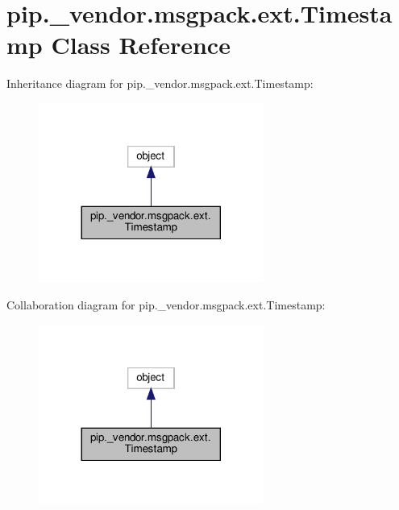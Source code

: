 \hypertarget{classpip_1_1__vendor_1_1msgpack_1_1ext_1_1Timestamp}{}\section{pip.\+\_\+vendor.\+msgpack.\+ext.\+Timestamp Class Reference}
\label{classpip_1_1__vendor_1_1msgpack_1_1ext_1_1Timestamp}


Inheritance diagram for pip.\+\_\+vendor.\+msgpack.\+ext.\+Timestamp\+:
\nopagebreak
\begin{figure}[H]
\begin{center}
\leavevmode
\includegraphics[width=209pt]{classpip_1_1__vendor_1_1msgpack_1_1ext_1_1Timestamp__inherit__graph}
\end{center}
\end{figure}


Collaboration diagram for pip.\+\_\+vendor.\+msgpack.\+ext.\+Timestamp\+:
\nopagebreak
\begin{figure}[H]
\begin{center}
\leavevmode
\includegraphics[width=209pt]{classpip_1_1__vendor_1_1msgpack_1_1ext_1_1Timestamp__coll__graph}
\end{center}
\end{figure}
